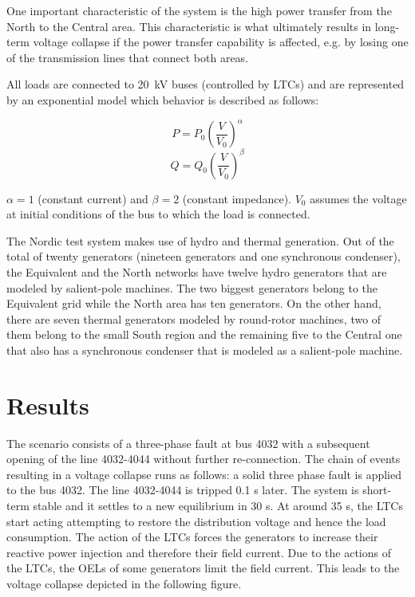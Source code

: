 \documentclass[a4paper, 12pt]{report}
\begin{document}
One important characteristic of the system is the high power transfer from the North to the Central area. This characteristic is what ultimately results in long-term voltage collapse if the power transfer capability is affected, e.g. by losing one of the transmission lines that connect both areas.

All loads are connected to 20~kV buses (controlled by LTCs) and are represented by an exponential model which behavior is described as follows:

\begin{equation} \label{Eq: 1}
P=P_{0} \left(  \dfrac{V}{V_{0}} \right)   ^{\alpha}
\end{equation}
\begin{equation} \label{Eq: 2}
Q=Q_{0} \left(  \dfrac{V}{V_{0}} \right)  ^{\beta}
\end{equation}

 $\alpha=1$ (constant current) and $\beta=2$ (constant impedance). $V_{0}$ assumes the voltage at initial conditions of the bus to which the load is connected.

The Nordic test system makes use of hydro and thermal generation. Out of the total of twenty generators (nineteen generators and one synchronous condenser), the Equivalent and the North networks have twelve hydro generators that are modeled by salient-pole machines. The two biggest generators belong to the Equivalent grid while the North area has ten generators. On the other hand, there are seven thermal generators modeled by round-rotor machines, two of them belong to the small South region and the remaining five to the Central one that also has a synchronous condenser that is modeled as a salient-pole machine.

\section{Results}

The scenario consists of a three-phase fault at bus 4032 with a subsequent opening of the line 4032-4044 without further re-connection.
The chain of events resulting in a voltage collapse runs as follows: a solid three phase fault is applied to the bus 4032. The line 4032-4044 is tripped 0.1 s later. The system is short-term stable and it settles to a new equilibrium in 30 s. At around 35 s, the LTCs start acting attempting to restore the distribution voltage and hence the load consumption. The action of the LTCs forces the generators to increase their reactive power injection and therefore their field current. Due to the actions of the LTCs, the OELs of some generators limit the field current. This leads to the voltage collapse depicted in the following figure.
\end{document}
